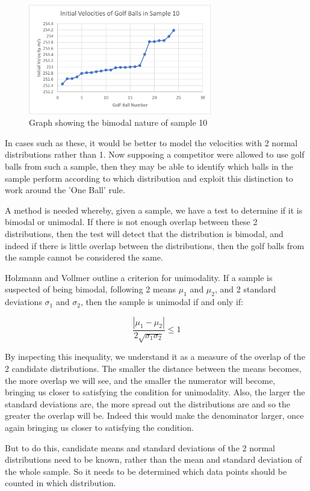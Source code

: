 \documentclass[11pt]{article}
\begin{document}
\begin{figure}[H]
    \centering
    \includegraphics[width=80mm]{Sample10.png}
    \caption{Graph showing the bimodal nature of sample 10}
    \label{figure 8}
\end{figure}


In cases such as these, it would be better to model the velocities with 2 normal distributions rather than 1. Now supposing a competitor were allowed to use golf balls from such a sample, then they may be able to identify which balls in the sample perform according to which distribution and exploit this distinction to work around the 'One Ball' rule.

A method is needed whereby, given a sample, we have a test to determine if it is bimodal or unimodal. If there is not enough overlap between these 2 distributions, then the test will detect that the distribution is bimodal, and indeed if there is little overlap between the distributions, then the golf balls from the sample cannot be considered the same.

Holzmann and Vollmer\cite{Analysis} outline a criterion for unimodality. If a sample is suspected of being bimodal, following 2 means $\mu_1$ and $\mu_2$, and 2 standard deviations $\sigma_1$ and $\sigma_2$, then the sample is unimodal if and only if:

$$\frac{|\mu_1-\mu_2|}{2\sqrt{\sigma_1\sigma_2}}\leq1$$

By inspecting this inequality, we understand it as a measure of the overlap of the 2 candidate distributions. The smaller the distance between the means becomes, the more overlap we will see, and the smaller the numerator will become, bringing us closer to satisfying the condition for unimodality. Also, the larger the standard deviations are, the more spread out the distributions are and so the greater the overlap will be. Indeed this would make the denominator larger, once again bringing us closer to satisfying the condition. 

But to do this, candidate means and standard deviations of the 2 normal distributions need to be known, rather than the mean and standard deviation of the whole sample. So it needs to be determined which data points should be counted in which distribution. 
\end{document}
